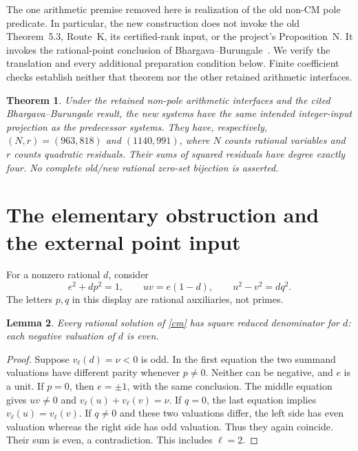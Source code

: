\documentclass[11pt]{article}
\newtheorem{theorem}{Theorem}
\newtheorem{lemma}[theorem]{Lemma}
\begin{document}
The one arithmetic premise removed here is realization of the old
non-CM pole predicate. In particular, the new construction does not
invoke the old Theorem~5.3, Route~K, its certified-rank input, or the
project's Proposition~N. It invokes the rational-point conclusion of
Bhargava--Burungale~\cite[Theorem~2.3]{BB}. We verify the translation
and every additional preparation condition below. Finite coefficient
checks establish neither that theorem nor the other retained
arithmetic interfaces.

\begin{theorem}\label{main}
Under the retained non-pole arithmetic interfaces and the cited
Bhargava--Burungale result, the new systems have the same intended
integer-input projection as the predecessor systems. They have,
respectively, $(N,r)=(963,818)$ and $(1140,991)$, where $N$ counts
rational variables and $r$ counts quadratic residuals. Their sums
of squared residuals have degree exactly four. No complete old/new
rational zero-set bijection is asserted.
\end{theorem}

\section{The elementary obstruction and the external point input}

For a nonzero rational $d$, consider
\begin{equation}\label{cm}
 e^2+dp^2=1,\qquad uv=e(1-d),\qquad u^2-v^2=dq^2.
\end{equation}
The letters $p,q$ in this display are rational auxiliaries, not primes.

\begin{lemma}\label{obstruction}
Every rational solution of \eqref{cm} has square reduced denominator
for $d$: each negative valuation of $d$ is even.
\end{lemma}
\begin{proof}
Suppose $v_\ell(d)=\nu<0$ is odd. In the first equation the two
summand valuations have different parity whenever $p\ne0$. Neither
can be negative, and $e$ is a unit. If $p=0$, then $e=\pm1$, with
the same conclusion. The middle equation gives $uv\ne0$ and
$v_\ell(u)+v_\ell(v)=\nu$. If $q=0$, the last equation implies
$v_\ell(u)=v_\ell(v)$. If $q\ne0$ and these two valuations differ,
the left side has even valuation whereas the right side has odd
valuation. Thus they again coincide. Their sum is even, a
contradiction. This includes $\ell=2$.
\end{proof}
\end{document}
